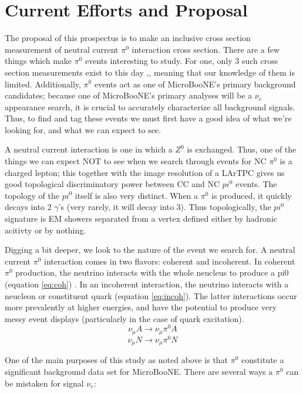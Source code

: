 \documentclass[12pt]{article}
\begin{document}
\section{Current Efforts and Proposal}
\par The proposal of this prospectus is to make an inclusive cross section measurement of neutral current $\pi^0$ interaction cross section. There are a few things which make $\pi^0$ events interesting to study.  For one, only 3 such cross section measurements exist to this day \cite{k2k},\cite{sciboone}, \cite{anderson} meaning that our knowledge of them is limited.  Additionally, $\pi^0$ events act as one of MicroBooNE's primary background candidates; because one of MicroBooNE's primary analyses will be a $\nu_e$ appearance search, it is crucial to accurately characterize all background signals. Thus, to find and tag these events we must first have a good idea of what we're looking for, and what we can expect to see.
\par A neutral current interaction is one in which a $Z^0$ is exchanged. Thus, one of the things we can expect NOT to see when we search through events for NC $\pi^0$ is a charged lepton; this together with the image resolution of a LArTPC gives us good topological discriminatory power between CC and NC $pi^0$ events. The topology of the $pi^0$ itself is also very distinct.  When a $\pi^0$ is produced, it quickly decays into 2 $\gamma$'s (very rarely, it will decay into 3). Thus topologically, the $pi^0$ signature is EM showers separated from a vertex defined either by hadronic acitivty or by nothing. 
\par Digging a bit deeper, we look to the nature of the event we search for.  A neutral current $\pi^0$ interaction comes in two flavors: coherent and incoherent.  In coherent $\pi^0$ production, the neutrino interacts with the whole neucleus to produce a pi0 (equation \ref{eq:coh}) .  In an incoherent interaction, the neutrino interacts with a neucleon or constituent quark (equation \ref{eq:incoh}). The latter interactions occur more prevalently at higher energies, and have the potential to produce very messy event displays (particularly in the case of quark excitation).   
\begin{equation} \label{eq:coh}
\nu_\mu A \rightarrow \nu_\mu \pi^0 A 
\end{equation}
\begin{equation} \label{eq:incoh}
\nu_\mu N \rightarrow \nu_\mu \pi^0 N
\end{equation}
\par One of the main purposes of this study as noted above is that $\pi^0$ constitute a significant background data set for MicroBooNE. There are several ways a $\pi^0$ can be mistaken for signal $\nu_e$:
\end{document}
